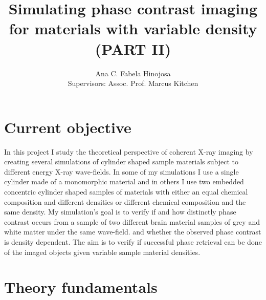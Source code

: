 \documentclass[9pt, a4paper]{article}
\title{Simulating phase contrast imaging for materials with variable density (PART II)}
\author{Ana C. Fabela Hinojosa \\
\small{Supervisors: Assoc. Prof. Marcus Kitchen}}
\begin{document}
\maketitle
\section{Current objective}
In this project I study the theoretical perspective of coherent X-ray imaging by creating several simulations of cylinder shaped sample materials subject to different energy X-ray wave-fields. In some of my simulations I use a single cylinder made of a monomorphic material and in others I use two embedded concentric cylinder shaped samples of materials with either an equal chemical composition and different densities or different chemical composition and the same density. 
My simulation's goal is to verify if and how distinctly phase contrast occurs from a sample of two different brain material samples of grey and white matter under the same wave-field. and whether the observed phase contrast is density dependent. The aim is to verify if successful phase retrieval can be done of the imaged objects given variable sample material densities.

\section{Theory fundamentals}
\end{document}
